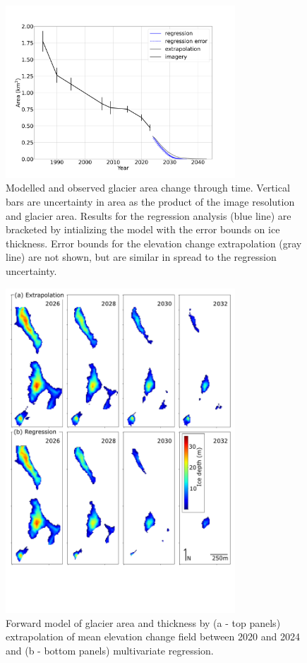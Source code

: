 \documentclass[annals,twocolumn,letterpaper]{igs.cls}
\begin{document}
\begin{figure}[H]
\centering
\includegraphics[width=86mm,trim=2.5cm 2cm 2.5cm 2cm, clip=true]
{area_through_time.pdf}
\caption{Modelled and observed glacier area change through time. Vertical bars are uncertainty in area as the product of the image resolution and glacier area. Results for the regression analysis (blue line) are bracketed by intializing the model with the error bounds on ice thickness. Error bounds for the elevation change extrapolation (gray line) are not shown, but are similar in spread to the regression uncertainty.}
\label{area}
\end{figure}

\begin{figure}[H]
\centering
\includegraphics[width=86mm,trim=0cm 4.3cm 0cm 0cm, clip=true]
{drawing.pdf}
\caption{Forward model of glacier area and thickness by (a - top panels) extrapolation of mean elevation change field between 2020 and 2024 and (b - bottom panels) multivariate regression.}
\label{loss_map}
\end{figure}
\end{document}
